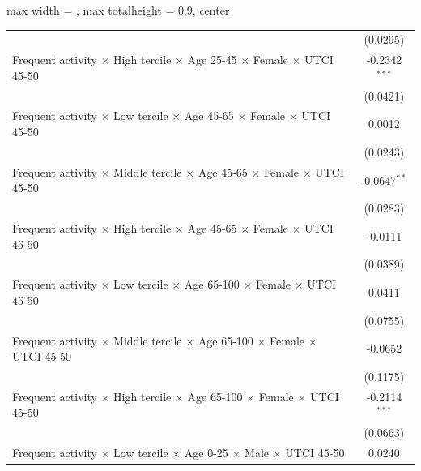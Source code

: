 \begin{table}[htbp]
\begin{adjustbox}{max width = \textwidth, max totalheight = 0.9\textheight, center}
\begin{tabular}{lc}
                                                                                                               & (0.0295)\\   
         Frequent activity $\times$ High tercile $\times$ Age 25-45 $\times$ Female $\times$ UTCI 45-50        & -0.2342$^{***}$\\   
                                                                                                               & (0.0421)\\   
         Frequent activity $\times$ Low tercile $\times$ Age 45-65 $\times$ Female $\times$ UTCI 45-50         & 0.0012\\   
                                                                                                               & (0.0243)\\   
         Frequent activity $\times$ Middle tercile $\times$ Age 45-65 $\times$ Female $\times$ UTCI 45-50      & -0.0647$^{**}$\\   
                                                                                                               & (0.0283)\\   
         Frequent activity $\times$ High tercile $\times$ Age 45-65 $\times$ Female $\times$ UTCI 45-50        & -0.0111\\   
                                                                                                               & (0.0389)\\   
         Frequent activity $\times$ Low tercile $\times$ Age 65-100 $\times$ Female $\times$ UTCI 45-50        & 0.0411\\   
                                                                                                               & (0.0755)\\   
         Frequent activity $\times$ Middle tercile $\times$ Age 65-100 $\times$ Female $\times$ UTCI 45-50     & -0.0652\\   
                                                                                                               & (0.1175)\\   
         Frequent activity $\times$ High tercile $\times$ Age 65-100 $\times$ Female $\times$ UTCI 45-50       & -0.2114$^{***}$\\   
                                                                                                               & (0.0663)\\   
         Frequent activity $\times$ Low tercile $\times$ Age 0-25 $\times$ Male $\times$ UTCI 45-50            & 0.0240\\   

\end{tabular}
\end{adjustbox}
\end{table}
